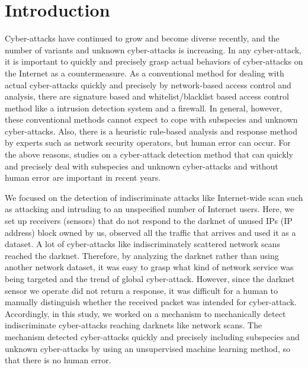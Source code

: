 \documentclass[conference]{IEEEtran}
\begin{document}
\section{Introduction}
Cyber-attacks have continued to grow and become diverse recently, and the number of variants and unknown cyber-attacks is increasing.
In any cyber-attack, it is important to quickly and precisely grasp actual behaviors of cyber-attacks on the Internet as a countermeasure.
As a conventional method for dealing with actual cyber-attacks quickly and precisely by network-based access control and analysis, there are signature based and whitelist/blacklist based access control method like a intrusion detection system and a firewall.
In general, however, these conventional methods cannot expect to cope with subspecies and unknown cyber-attacks.
Also, there is a heuristic rule-based analysis and response method by experts such as network security operators, but human error can occur.
For the above reasons, studies on a cyber-attack detection method that can quickly and precisely deal with subspecies and unknown cyber-attacks and without human error are important in recent years.



We focused on the detection of indiscriminate attacks like Internet-wide scan such as attacking and intruding to an unspecified number of Internet users.
Here, we set up receivers (sensors) that do not respond to the darknet of unused IPs (IP address) block owned by us, observed all the traffic that arrives and used it as a dataset.
A lot of cyber-attacks like indiscriminately scattered network scans reached the darknet.
Therefore, by analyzing the darknet rather than using another network dataset, it was easy to grasp what kind of network service was being targeted and the trend of global cyber-attack.
However, since the darknet sensor we operate did not return a response, it was difficult for a human to manually distinguish whether the received packet was intended for cyber-attack.
Accordingly, in this study, we worked on a mechanism to mechanically detect indiscriminate cyber-attacks reaching darknets like network scans.
The mechanism detected cyber-attacks quickly and precisely including subspecies and unknown cyber-attacks by using an unsupervised machine learning method, so that there is no human error.
\end{document}
